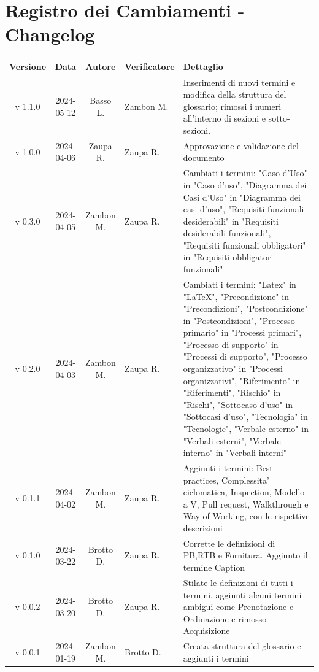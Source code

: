 \documentclass[12pt, oneside]{article}
\begin{document}
\section*{Registro dei Cambiamenti - Changelog}
\begin{tabular}{|c|c|c|p{3cm}|p{6cm}|}
\hline
\textbf{Versione} & \textbf{Data} & \textbf{Autore} & \textbf{Verificatore} & \textbf{Dettaglio} \\
\hline
v 1.1.0 & 2024-05-12 & Basso L. & Zambon M. & Inserimenti di nuovi termini e modifica della struttura del glossario; rimossi i numeri all'interno di sezioni e sotto-sezioni.\\
\hline
v 1.0.0 & 2024-04-06 & Zaupa R. & Zaupa R. & Approvazione e validazione del documento\\
\hline
v 0.3.0 & 2024-04-05 & Zambon M. & Zaupa R. & Cambiati i termini: "Caso d'Uso" in "Caso d'uso", "Diagramma dei Casi d'Uso" in "Diagramma dei casi d'uso", "Requisiti funzionali desiderabili" in "Requisiti desiderabili funzionali", "Requisiti funzionali obbligatori" in "Requisiti obbligatori funzionali"\\
\hline
v 0.2.0 & 2024-04-03 & Zambon M. & Zaupa R. & Cambiati i termini: "Latex" in "LaTeX", "Precondizione" in "Precondizioni", "Postcondizione" in "Postcondizioni", "Processo primario" in "Processi primari", "Processo di supporto" in "Processi di supporto", "Processo organizzativo" in "Processi organizzativi", "Riferimento" in "Riferimenti", "Rischio" in "Rischi", "Sottocaso d'uso" in "Sottocasi d'uso", "Tecnologia" in "Tecnologie", "Verbale esterno" in "Verbali esterni", "Verbale interno" in "Verbali interni"\\
\hline
v 0.1.1 & 2024-04-02 & Zambon M. & Zaupa R. & Aggiunti i termini: Best practices, Complessita' ciclomatica, Inspection, Modello a V, Pull request, Walkthrough e Way of Working, con le rispettive descrizioni\\
\hline
v 0.1.0 & 2024-03-22 & Brotto D. & Zaupa R. & Corrette le definizioni di PB,RTB e Fornitura. Aggiunto il termine Caption\\
\hline
v 0.0.2 & 2024-03-20 & Brotto D. & Zaupa R. & Stilate le definizioni di tutti i termini, aggiunti alcuni termini ambigui come Prenotazione e Ordinazione e rimosso Acquisizione \\
\hline
v 0.0.1 & 2024-01-19 & Zambon M. & Brotto D. & Creata struttura del glossario e aggiunti i termini \\
\hline
\end{tabular}
\newpage
\end{document}
